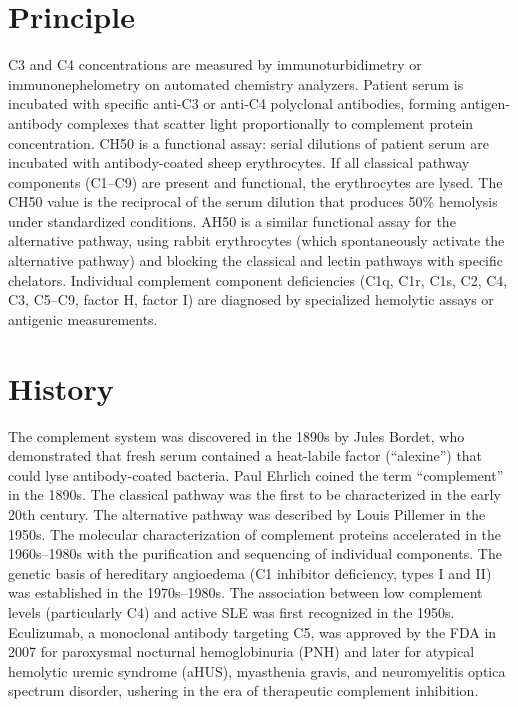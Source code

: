 \section*{Principle}
C3 and C4 concentrations are measured by immunoturbidimetry or immunonephelometry on automated chemistry analyzers. Patient serum is incubated with specific anti-C3 or anti-C4 polyclonal antibodies, forming antigen-antibody complexes that scatter light proportionally to complement protein concentration. CH50 is a functional assay: serial dilutions of patient serum are incubated with antibody-coated sheep erythrocytes. If all classical pathway components (C1--C9) are present and functional, the erythrocytes are lysed. The CH50 value is the reciprocal of the serum dilution that produces 50\% hemolysis under standardized conditions. AH50 is a similar functional assay for the alternative pathway, using rabbit erythrocytes (which spontaneously activate the alternative pathway) and blocking the classical and lectin pathways with specific chelators. Individual complement component deficiencies (C1q, C1r, C1s, C2, C4, C3, C5--C9, factor H, factor I) are diagnosed by specialized hemolytic assays or antigenic measurements.

\section*{History}
The complement system was discovered in the 1890s by Jules Bordet, who demonstrated that fresh serum contained a heat-labile factor (``alexine'') that could lyse antibody-coated bacteria. Paul Ehrlich coined the term ``complement'' in the 1890s. The classical pathway was the first to be characterized in the early 20th century. The alternative pathway was described by Louis Pillemer in the 1950s. The molecular characterization of complement proteins accelerated in the 1960s--1980s with the purification and sequencing of individual components. The genetic basis of hereditary angioedema (C1 inhibitor deficiency, types I and II) was established in the 1970s--1980s. The association between low complement levels (particularly C4) and active SLE was first recognized in the 1950s. Eculizumab, a monoclonal antibody targeting C5, was approved by the FDA in 2007 for paroxysmal nocturnal hemoglobinuria (PNH) and later for atypical hemolytic uremic syndrome (aHUS), myasthenia gravis, and neuromyelitis optica spectrum disorder, ushering in the era of therapeutic complement inhibition.

